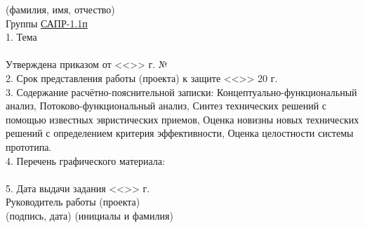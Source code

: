 \begin{titlepage}
\begin{flushleft}
            \vspace{-0.2cm}\hspace{5cm}\footnotesize(фамилия, имя, отчество)\normalsize\\
        Группы \underline{\hspace{1cm}САПР-1.1п\hspace{2cm}}\\
        1. Тема \underline{\hspace{15.2cm}}\\
        \underline{\hspace{\textwidth}}\\
        Утверждена приказом от <<\underline{\hspace{1cm}}>> \underline{\hspace{4cm}} 
            \the\year г. № \underline{\hspace{3.6cm}}\\
        2. Срок представления работы (проекта) к защите 
            <<\underline{\hspace{1cm}}>> \underline{\hspace{2.8cm}} 20\underline{\hspace{0.5cm}} г.\\
        3. Содержание расчётно-пояснительной записки: Концептуально-функциональный анализ, 
            Потоково-функциональный анализ, Синтез технических решений с помощью известных эвристических приемов, 
            Оценка новизны новых технических решений с определением критерия эффективности, 
            Оценка целостности системы прототипа.\\
        4. Перечень графического материала: \underline{\hspace{8.7cm}}\\
        \underline{\hspace{\textwidth}}\\
        5. Дата выдачи задания <<\underline{\hspace{1cm}}>> \underline{\hspace{4cm}} \the\year г.\\
        Руководитель работы (проекта) \underline{\hspace{5cm}}
            \hspace{0.5cm} \underline{\hspace{4.2cm}}\\
            \vspace{-0.2cm}\hspace{8cm}\footnotesize(подпись, дата)
            \hspace{3cm}(инициалы и фамилия)\normalsize\\

\end{flushleft}
\end{titlepage}
